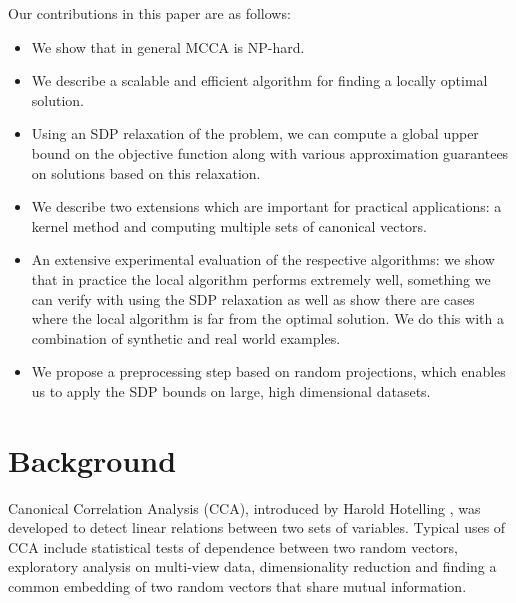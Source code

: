 Our contributions in this paper are as follows:
\begin{itemize}
\item We show that in general MCCA is NP-hard.
\item We describe a scalable and efficient algorithm for finding a locally optimal solution.
\item Using an SDP relaxation of the problem, we can compute a
  global upper bound on the objective function along with various
  approximation guarantees on solutions based on this relaxation.
\item We describe two extensions which are important for practical applications: a kernel method and computing multiple sets of canonical vectors.
\item An extensive experimental evaluation of the respective algorithms: we show that in practice the local algorithm performs extremely well, something we can verify with using the SDP relaxation as well as show there are cases where the local algorithm is far from the optimal solution. We do this with a combination of synthetic and real world examples.
\item We propose a preprocessing step based on random projections, which enables us to apply the SDP bounds on large, high dimensional datasets.
\end{itemize}

\vspace{-0.1cm}
\section{Background}\label{sec:Background}
Canonical Correlation Analysis (CCA), introduced by Harold Hotelling \cite{Hotelling},  was developed to detect linear relations between two sets of variables. Typical uses of CCA include
statistical tests of dependence between two random vectors, exploratory analysis on multi-view data, dimensionality reduction and finding a common embedding of two random vectors that share mutual information.

